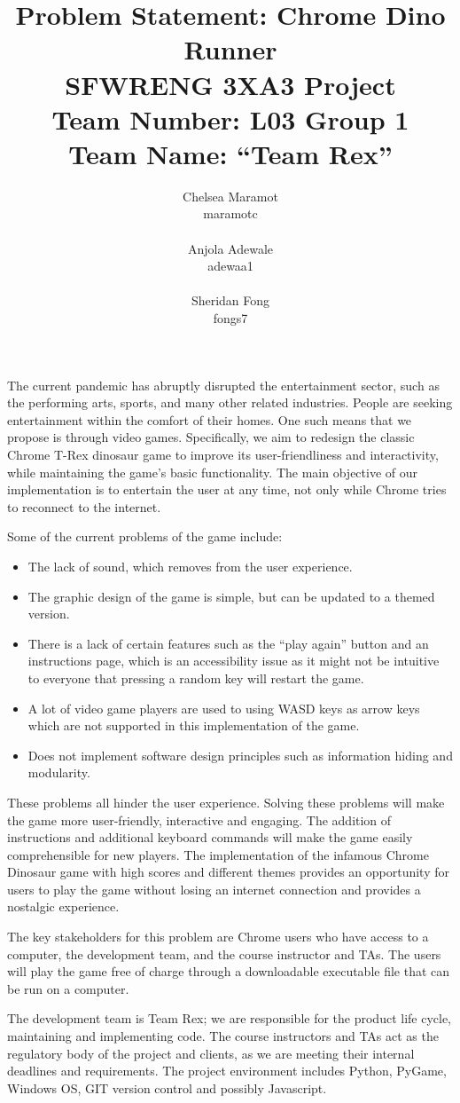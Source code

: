 \documentclass{article}
\title{Problem Statement: Chrome Dino Runner \\ \bigskip \large SFWRENG 3XA3 Project \\ \bigskip \large Team Number: L03 Group 1 \\ \large Team Name: ``Team Rex'' }
\author{Chelsea Maramot \\ maramotc \\ \\ Anjola Adewale \\ adewaa1 \\ \\ Sheridan Fong \\ fongs7 }
\begin{document}
\maketitle
\newpage

The current pandemic has abruptly disrupted the entertainment sector, such as the performing arts, sports, and many other related industries. People are seeking entertainment within the comfort of their homes. One such means that we propose is through video games. Specifically, we aim to redesign the classic Chrome T-Rex dinosaur game to improve its user-friendliness and interactivity, while maintaining the game’s basic functionality. The main objective of our implementation is to entertain the user at any time, not only while Chrome tries to reconnect to the internet.
\bigskip

Some of the current problems of the game include:


\begin{itemize}
    \item The lack of sound, which removes from the user experience. 
    \item The graphic design of the game is simple, but can be updated to a themed version. 
    \item There is a lack of certain features such as the “play again” button and an instructions page, which is an accessibility issue as it might not be intuitive to everyone that pressing a random key will restart the game.
    \item A lot of video game players are used to using WASD keys as arrow keys which are not supported in this implementation of the game.
    \item Does not implement software design principles such as information hiding and modularity. 
\end{itemize}

These problems all hinder the user experience. Solving these problems will make the game more user-friendly, interactive and engaging. The addition of instructions and additional keyboard commands will make the game easily comprehensible for new players. The implementation of the infamous Chrome Dinosaur game with high scores and different themes provides an opportunity for users to play the game without losing an internet connection and provides a nostalgic experience.

\bigskip

The key stakeholders for this problem are Chrome users who have access to a computer, the development team, and the course instructor and TAs. The users will play the game free of charge through a downloadable executable file that can be run on a computer.

\bigskip

The development team is Team Rex; we are responsible for the product life cycle, maintaining and implementing code. The course instructors and TAs act as the regulatory body of the project and clients, as we are meeting their internal deadlines and requirements. The project environment includes Python, PyGame, Windows OS, GIT version control and possibly Javascript. 
\end{document}
